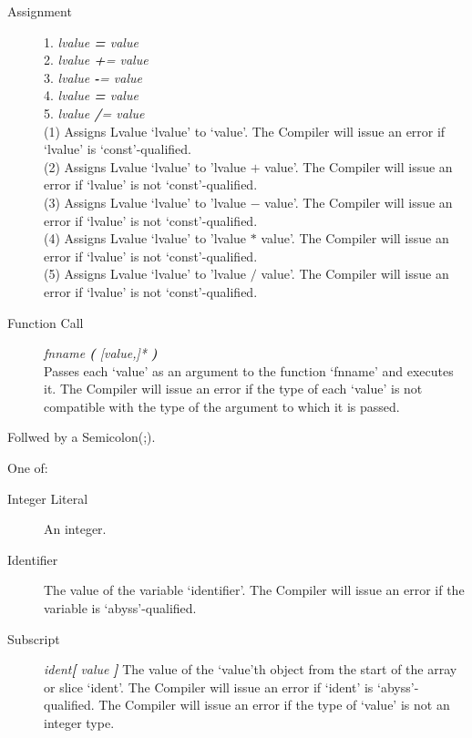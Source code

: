 \documentclass{article}
\begin{document}
\begin{description}
\begin{description}
		\item[Assignment]
			\hfill 1. \textit{lvalue \textbf = value} \\
			{}\hfill 2. \textit{lvalue \textbf += value} \\
			{}\hfill 3. \textit{lvalue \textbf -= value} \\
			{}\hfill 4. \textit{lvalue \textbf *= value} \\
			{}\hfill 5. \textit{lvalue \textbf /= value} \\
			(1) Assigns Lvalue `lvalue' to `value'. The Compiler will issue an error if `lvalue' is `const'-qualified. \\
			(2) Assigns Lvalue `lvalue' to 'lvalue $+$ value'. The Compiler will issue an error if `lvalue' is not `const'-qualified.\\
			(3) Assigns Lvalue `lvalue' to 'lvalue $-$ value'. The Compiler will issue an error if `lvalue' is not `const'-qualified.\\
			(4) Assigns Lvalue `lvalue' to 'lvalue $*$ value'. The Compiler will issue an error if `lvalue' is not `const'-qualified.\\
			(5) Assigns Lvalue `lvalue' to 'lvalue $/$ value'. The Compiler will issue an error if `lvalue' is not `const'-qualified.\\

		\item[Function Call] \hfill \textit{fnname \textbf ( [value,]* \textbf ) } \\
			Passes each `value' as an argument to the function `fnname' and executes it. The Compiler will issue an error if the type of each `value' is not compatible with the type of the argument to which it is passed.

		\end{description}
		Follwed by a Semicolon(;). 

	\item[Value]
		One of:
		\begin{description}
		\item[Integer Literal] An integer.
		\item[Identifier] The value of the variable `identifier'. The Compiler will issue an error if the variable is `abyss'-qualified.
		\item[Subscript] \textit{ident\textbf[ value \textbf]} The value of the `value'th object from the start of the array or slice `ident'.
			The Compiler will issue an error if `ident' is `abyss'-qualified.
			The Compiler will issue an error if the type of `value' is not an integer type.


\end{description}
\end{description}
\end{document}
